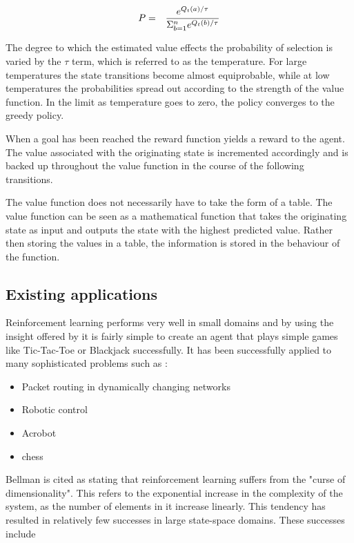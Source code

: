 \documentclass{rucsthesis}
\begin{document}
\begin{eqnarray}
\centering
P & = & \frac{e^{Q_{t}(a)/\tau}}{\Sigma_{b=1}^{n}e^{Q_{t}(b)/\tau}} \label{eq:softmax}
\end{eqnarray}

The degree to which the estimated value effects the probability of selection is varied by the $\tau$ term, which is referred to as the temperature. For large temperatures the state transitions become almost equiprobable, while at low temperatures the probabilities spread out according to the strength of the value function. In the limit as temperature goes to zero, the policy converges to the greedy policy.

When a goal has been reached the reward function yields a reward to the agent.  The value  associated with the originating state is incremented accordingly and is backed up throughout the value function in the course of the following transitions\citep{suttonbarto}.

The value function does not necessarily have to take the form of a table. The value function can be seen as a mathematical function that takes the originating state as input and outputs the state with the highest predicted value. Rather then storing the values in a table, the information is stored in the behaviour of the function.

\subsection{Existing applications}

Reinforcement learning performs very well in small domains and by using the insight offered by \cite{suttonbarto} it is fairly simple to create an agent that plays simple games like Tic-Tac-Toe or Blackjack successfully. It has been successfully applied to many sophisticated problems such as :

\begin{itemize}
\item{Packet routing in dynamically changing networks \citep{boyan94packet}}
\item{Robotic control \citep{rlrobotics}}
\item{Acrobot \citep{suttonbarto} }
\item{chess \citep{baxter98knightcap}}
\end{itemize}

Bellman is cited \citep{suttonbarto} as stating that reinforcement learning suffers from the "curse of dimensionality".  This refers to the exponential increase in the complexity of the system, as the number of elements in it increase linearly. This tendency has resulted in relatively few successes in large state-space domains\citep{keepaway}. These successes include 
\end{document}
